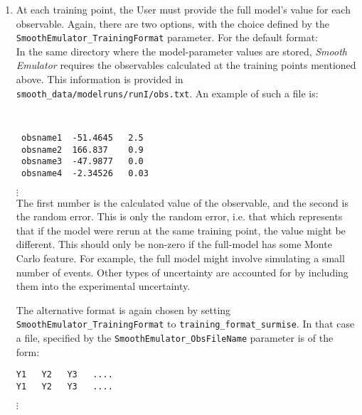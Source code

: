 \documentclass[UserManual.tex]{subfiles}
\begin{document}
\begin{enumerate}
\item At each training point, the User must provide the full model's value for each observable. Again, there are two options, with the choice defined by the {\tt SmoothEmulator\_TrainingFormat} parameter. For the default format:\\
In the same directory where the model-parameter values are stored, {\it Smooth Emulator} requires the observables calculated at the training points mentioned above. This information is provided in {\tt smooth\_data/modelruns/runI/obs.txt}. An example of such a file is:
{\tt
\begin{verbatim}
 obsname1  -51.4645   2.5
 obsname2  166.837    0.9
 obsname3  -47.9877   0.0
 obsname4  -2.34526   0.03
\end{verbatim}}
\vspace*{-16pt}
 \hspace*{28pt}$\vdots$\\
The first number is the calculated value of the observable, and the second is the random error. This is only the random error, i.e. that which represents that if the model were rerun at the same training point, the value might be different. This should only be non-zero if the full-model has some Monte Carlo feature. For example, the full model might involve simulating a small number of events. Other types of uncertainty are accounted for by including them into the experimental uncertainty.

The alternative format is again chosen by setting {\tt SmoothEmulator\_TrainingFormat} to {\tt training\_format\_surmise}. In that case a file, specified by the {\tt SmoothEmulator\_ObsFileName} parameter is of the form:\\
\vspace*{-8pt}
{\tt\begin{verbatim}
Y1   Y2   Y3   ....
Y1   Y2   Y3   ....
\end{verbatim}}
\vspace*{-16pt}
 \hspace*{28pt}$\vdots$\\


\end{enumerate}
\end{document}

